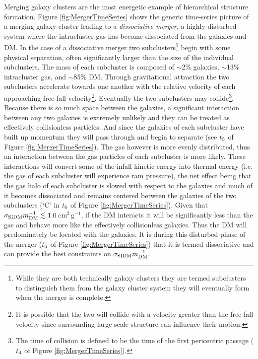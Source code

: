 Merging galaxy clusters are the most energetic example of hierarchical structure formation.
Figure \ref{fig:MergerTimeSeries} shows the generic time-series picture of a merging galaxy cluster leading to a \textit{dissociative merger}, a highly disturbed system where the intracluster gas has become dissociated from the galaxies and DM.
In the case of a dissociative merger two subclusters\footnote{While they are both technically galaxy clusters they are termed subclusters to distinguish them from the galaxy cluster system they will eventually form when the merger is complete.} begin with some physical separation, often significantly larger than the size of the individual subclusters.
The mass of each subcluster is composed of $\sim$2\% galaxies, $\sim$13\% intracluster gas, and $\sim$85\% DM.
Through gravitational attraction the two subclusters accelerate towards one another with the relative velocity of each approaching free-fall velocity\footnote{It is possible that the two will collide with a velocity greater than the free-fall velocity since surrounding large scale structure can influence their motion.}.
Eventually the two subclusters may collide\footnote{The time of collision is defined to be the time of the first pericentric passage ($t_{\rm 4}$ of Figure \ref{fig:MergerTimeSeries}).}. 
Because there is so much space between the galaxies, a significant interaction between any two galaxies is extremely unlikely and they can be treated as effectively collisionless particles.
And since the galaxies of each subcluster have built up momentum they will pass through and begin to separate (see $t_{\rm 5}$ of Figure \ref{fig:MergerTimeSeries}).
The gas however is more evenly distributed, thus an interaction between the gas particles of each subcluster is more likely.
These interactions will convert some of the infall kinetic energy into thermal energy (i.e. the gas of each subcluster will experience ram pressure), the net effect being that the gas halo of each subcluster is slowed with respect to the galaxies and much of it becomes dissociated and remains centered between the galaxies of the two subclusters (`C' in $t_{\rm 6}$ of Figure \ref{fig:MergerTimeSeries}).
Given that $\sigma_{\rm SIDM}m_{\rm DM}^{-1} \lesssim 1.0$\,cm$^2$\,g$^{-1}$, if the DM interacts it will be significantly less than the gas and behave more like the effectively collisionless galaxies.
Thus the DM will predominately be located with the galaxies. 
It is during this disturbed phase of the merger ($t_{\rm 6}$ of Figure \ref{fig:MergerTimeSeries}) that it is termed dissociative and can provide the best constraints on  $\sigma_{\rm SIDM}m_{\rm DM}^{-1}$.  

